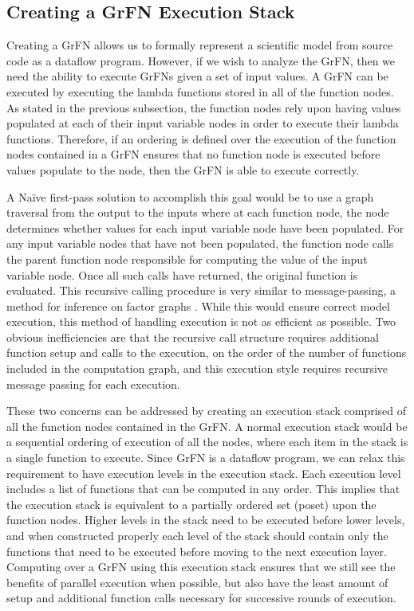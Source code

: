 \subsection{Creating a GrFN Execution Stack \label{sec:exec_stack_creation}}
Creating a GrFN allows us to formally represent a scientific model from source code as a dataflow program.
However, if we wish to analyze the GrFN, then we need the ability to execute GrFNs given a set of input values.
A GrFN can be executed by executing the lambda functions stored in all of the function nodes.
As stated in the previous subsection, the function nodes rely upon having values populated at each of their input variable nodes in order to execute their lambda functions.
Therefore, if an ordering is defined over the execution of the function nodes contained in a GrFN ensures that no function node is executed before values populate to the node, then the GrFN is able to execute correctly.

A Naïve first-pass solution to accomplish this goal would be to use a graph traversal from the output to the inputs where at each function node, the node determines whether values for each input variable node have been populated.
For any input variable nodes that have not been populated, the function node calls the parent function node responsible for computing the value of the input variable node.
Once all such calls have returned, the original function is evaluated. This recursive calling procedure is very similar to message-passing, a method for inference on factor graphs \citep{bishop2006pattern}.
While this would ensure correct model execution, this method of handling execution is not as efficient as possible.
Two obvious inefficiencies are that the recursive call structure requires additional function setup and calls to the execution, on the order of the number of functions included in the computation graph, and this execution style requires recursive message passing for each execution.

These two concerns can be addressed by creating an execution stack comprised of all the function nodes contained in the GrFN.
A normal execution stack would be a sequential ordering of execution of all the nodes, where each item in the stack is a single function to execute.
Since GrFN is a dataflow program, we can relax this requirement to have execution levels in the execution stack.
Each execution level includes a list of functions that can be computed in any order.
This implies that the execution stack is equivalent to a partially ordered set (poset) \citep{simovici2008miningTools} upon the function nodes.
Higher levels in the stack need to be executed before lower levels, and when constructed properly each level of the stack should contain only the functions that need to be executed before moving to the next execution layer.
Computing over a GrFN using this execution stack ensures that we still see the benefits of parallel execution when possible, but also have the least amount of setup and additional function calls necessary for successive rounds of execution.

